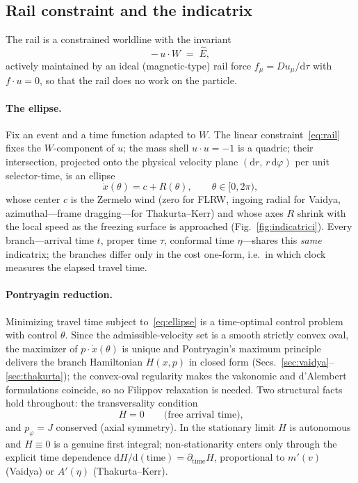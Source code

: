 \documentclass[
    aps, prd, twocolumn, superscriptaddress,
    showpacs, nofootinbib, floatfix
]{revtex4-2}
\newcommand{\Ehat}{\hat E}
\newcommand{\dd}{\mathrm{d}}
\begin{document}
\subsection{Rail constraint and the indicatrix}
\label{sec:indicatrix}
The rail is a constrained worldline with the invariant
\begin{equation}
    -\,u\cdot W \;=\; \Ehat ,
    \label{eq:rail}
\end{equation}
actively maintained by an ideal (magnetic-type) rail force $f_\mu=Du_\mu/\dd\tau$
with $f\cdot u=0$, so that the rail does no work on the particle.

\paragraph{The ellipse.} Fix an event and a time function adapted to $W$. The
linear constraint~\eqref{eq:rail} fixes the $W$-component of $u$; the mass shell
$u\cdot u=-1$ is a quadric; their intersection, projected onto the physical
velocity plane $(\dd r,\,r\,\dd\varphi)$ per unit selector-time, is an ellipse
\begin{equation}
    \dot x(\theta)=c+R(\theta),\qquad \theta\in[0,2\pi),
    \label{eq:ellipse}
\end{equation}
whose center $c$ is the Zermelo wind (zero for FLRW, ingoing radial for Vaidya,
azimuthal---frame dragging---for Thakurta--Kerr) and whose axes $R$ shrink with
the local speed as the freezing surface is approached (Fig.~\ref{fig:indicatrici}).
Every branch---arrival time $t$, proper time $\tau$, conformal time $\eta$---shares
this \emph{same} indicatrix; the branches differ only in the cost one-form, i.e.\
in which clock measures the elapsed travel time.

\paragraph{Pontryagin reduction.} Minimizing travel time subject
to~\eqref{eq:ellipse} is a time-optimal control problem with control $\theta$.
Since the admissible-velocity set is a smooth strictly convex oval, the maximizer
of $p\cdot\dot x(\theta)$ is unique and Pontryagin's maximum principle
\cite{Pontryagin,Liberzon} delivers the branch Hamiltonian $H(x,p)$ in closed
form (Secs.~\ref{sec:vaidya}--\ref{sec:thakurta}); the convex-oval regularity
makes the vakonomic and d'Alembert formulations coincide, so no Filippov
relaxation is needed. Two structural facts hold throughout: the transversality
condition
\begin{equation}
    H=0 \qquad\text{(free arrival time),}
    \label{eq:transversality}
\end{equation}
and $p_\varphi=J$ conserved (axial symmetry). In the stationary limit $H$ is
autonomous and $H\equiv0$ is a genuine first integral; non-stationarity enters
only through the explicit time dependence $\dd H/\dd(\text{time})=
\partial_{\text{time}}H$, proportional to $m'(v)$ (Vaidya) or $A'(\eta)$
(Thakurta--Kerr).
\end{document}
